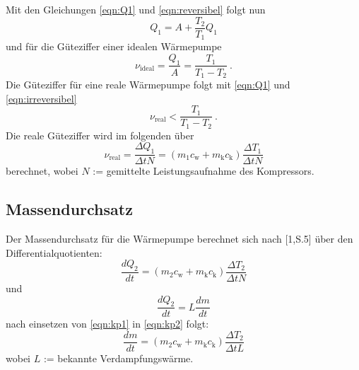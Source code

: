 Mit den Gleichungen \ref{eqn:Q1} und \ref{eqn:reversibel} folgt nun
\begin{equation}
	Q_\text{1} = A + \frac{T_\text{2}}{T_\text{1}} Q_\text{1}
\end{equation}
und für die Güteziffer einer idealen Wärmepumpe
\begin{equation}
	\nu_\text{ideal} = \frac{Q_\text{1}}{A} = \frac{T_\text{1}}{T_\text{1} - T_\text{2}} \ .
	\label{eqn:nuideal}
\end{equation}
Die Güteziffer für eine reale Wärmepumpe folgt mit \ref{eqn:Q1} und \ref{eqn:irreversibel}
\begin{equation}
	\nu_\text{real} < \frac{T_\text{1}}{T_\text{1} - T_\text{2}} \ .
\end{equation}
Die reale Güteziffer wird im folgenden über
\begin{equation}
	\nu_\text{real} = \frac{\Delta Q_\text{1}}{\Delta t N} = (m_\text{1} c_\text{w} + m_\text{k} c_\text{k}) \frac{\Delta T_\text{1}}{\Delta t N}
	\label{eqn:nureal}
\end{equation}
 berechnet, wobei $N$ := gemittelte Leistungsaufnahme des Kompressors.

\subsection{Massendurchsatz}
Der Massendurchsatz für die Wärmepumpe berechnet sich nach [1,S.5] über den Differentialquotienten:
\begin{equation}
	\label{eqn:kp1}
	\frac{d Q_\text{2}}{d t} = (m_\text{2} c_\text{w} + m_\text{k} c_\text{k}) \frac{\Delta T_\text{2}}{\Delta t N}
\end{equation}
und
\begin{equation}
	\label{eqn:kp2}
	\frac{d Q_\text{2}}{d t} = L \frac{d m}{d t}
\end{equation}
nach einsetzen von \ref{eqn:kp1} in \ref{eqn:kp2} folgt:
\begin{equation}
	\frac{dm}{dt} = (m_\text{2} c_\text{w} + m_\text{k} c_\text{k}) \frac{\Delta T_\text{2}}{\Delta t L}
\end{equation}
wobei $L$ := bekannte Verdampfungswärme.

